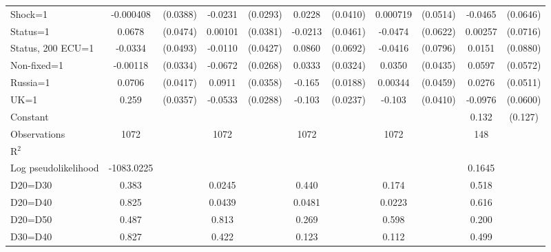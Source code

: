 \begin{tabular}{l|cccccccc|cc}
Shock=1         &-0.000408         & (0.0388)&  -0.0231         & (0.0293)&   0.0228         & (0.0410)& 0.000719         & (0.0514)&  -0.0465         & (0.0646)\\
Status=1        &   0.0678         & (0.0474)&  0.00101         & (0.0381)&  -0.0213         & (0.0461)&  -0.0474         & (0.0622)&  0.00257         & (0.0716)\\
Status, 200 ECU=1&  -0.0334         & (0.0493)&  -0.0110         & (0.0427)&   0.0860         & (0.0692)&  -0.0416         & (0.0796)&   0.0151         & (0.0880)\\
Non-fixed=1     & -0.00118         & (0.0334)&  -0.0672\sym{**} & (0.0268)&   0.0333         & (0.0324)&   0.0350         & (0.0435)&   0.0597         & (0.0572)\\
Russia=1        &   0.0706\sym{*}  & (0.0417)&   0.0911\sym{**} & (0.0358)&   -0.165\sym{***}& (0.0188)&  0.00344         & (0.0459)&   0.0276         & (0.0511)\\
UK=1            &    0.259\sym{***}& (0.0357)&  -0.0533\sym{*}  & (0.0288)&   -0.103\sym{***}& (0.0237)&   -0.103\sym{**} & (0.0410)&  -0.0976         & (0.0600)\\
Constant        &                  &         &                  &         &                  &         &                  &         &    0.132         &  (0.127)\\
\hline
Observations    &     1072         &         &     1072         &         &     1072         &         &     1072         &         &      148         &         \\
R$^2$      &                  &         &                  &         &                  &         &           &  & &  \\ 
Log pseudolikelihood  & -1083.0225    &         &                  &         &                  &         &           &   & 0.1645 & \\ 
D20=D30         &    0.383         &         &   0.0245         &         &    0.440         &         &    0.174         &         &    0.518         &         \\
D20=D40         &    0.825         &         &   0.0439         &         &   0.0481         &         &   0.0223         &         &    0.616         &         \\
D20=D50         &    0.487         &         &    0.813         &         &    0.269         &         &    0.598         &         &    0.200         &         \\
D30=D40         &    0.827         &         &    0.422         &         &    0.123         &         &    0.112         &         &    0.499         &         \\

\end{tabular}
